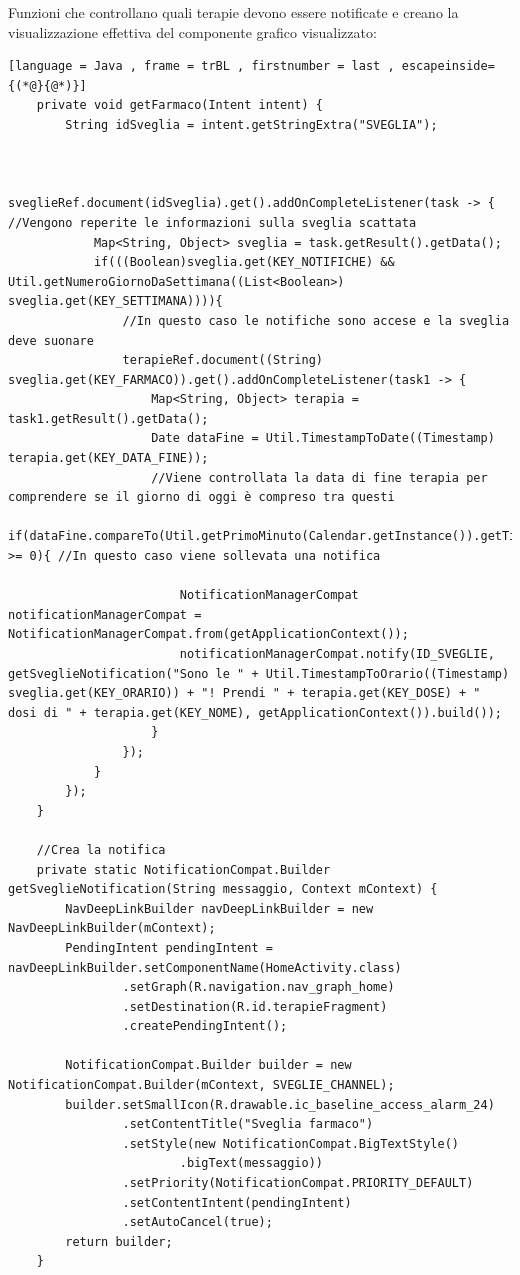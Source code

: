 \documentclass[12pt,a4paper,openright,twoside]{report}
\begin{document}
Funzioni che controllano quali terapie devono essere notificate e creano la visualizzazione effettiva del componente grafico visualizzato:
\begin{lstlisting}[language = Java , frame = trBL , firstnumber = last , escapeinside={(*@}{@*)}]
    private void getFarmaco(Intent intent) {
        String idSveglia = intent.getStringExtra("SVEGLIA");

        
        sveglieRef.document(idSveglia).get().addOnCompleteListener(task -> { //Vengono reperite le informazioni sulla sveglia scattata
            Map<String, Object> sveglia = task.getResult().getData();
            if(((Boolean)sveglia.get(KEY_NOTIFICHE) && Util.getNumeroGiornoDaSettimana((List<Boolean>) sveglia.get(KEY_SETTIMANA)))){
                //In questo caso le notifiche sono accese e la sveglia deve suonare
                terapieRef.document((String) sveglia.get(KEY_FARMACO)).get().addOnCompleteListener(task1 -> {
                    Map<String, Object> terapia = task1.getResult().getData();
                    Date dataFine = Util.TimestampToDate((Timestamp) terapia.get(KEY_DATA_FINE));
                    //Viene controllata la data di fine terapia per comprendere se il giorno di oggi è compreso tra questi
                    if(dataFine.compareTo(Util.getPrimoMinuto(Calendar.getInstance()).getTime()) >= 0){ //In questo caso viene sollevata una notifica
                    
                        NotificationManagerCompat notificationManagerCompat = NotificationManagerCompat.from(getApplicationContext());
                        notificationManagerCompat.notify(ID_SVEGLIE, getSveglieNotification("Sono le " + Util.TimestampToOrario((Timestamp) sveglia.get(KEY_ORARIO)) + "! Prendi " + terapia.get(KEY_DOSE) + " dosi di " + terapia.get(KEY_NOME), getApplicationContext()).build());
                    }
                });
            }
        });
    }

    //Crea la notifica
    private static NotificationCompat.Builder getSveglieNotification(String messaggio, Context mContext) {
        NavDeepLinkBuilder navDeepLinkBuilder = new NavDeepLinkBuilder(mContext);
        PendingIntent pendingIntent = navDeepLinkBuilder.setComponentName(HomeActivity.class)
                .setGraph(R.navigation.nav_graph_home)
                .setDestination(R.id.terapieFragment)
                .createPendingIntent();

        NotificationCompat.Builder builder = new NotificationCompat.Builder(mContext, SVEGLIE_CHANNEL);
        builder.setSmallIcon(R.drawable.ic_baseline_access_alarm_24)
                .setContentTitle("Sveglia farmaco")
                .setStyle(new NotificationCompat.BigTextStyle()
                        .bigText(messaggio))
                .setPriority(NotificationCompat.PRIORITY_DEFAULT)
                .setContentIntent(pendingIntent)
                .setAutoCancel(true);
        return builder;
    }
\end{lstlisting}
\end{document}
